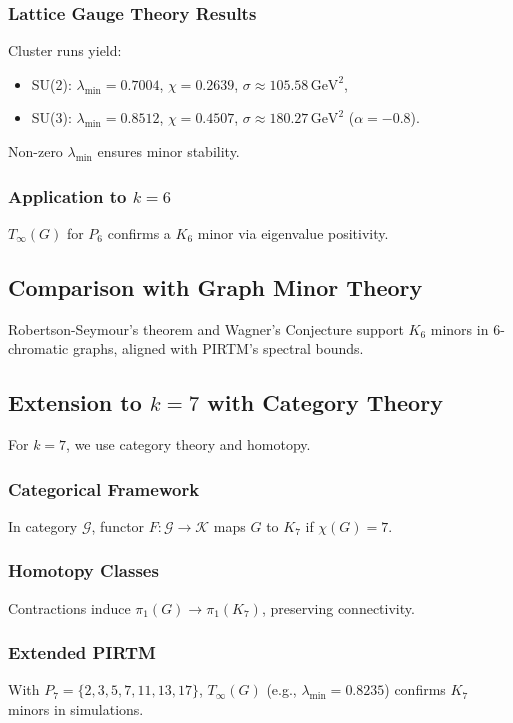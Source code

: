 \documentclass[11pt]{article}
\theoremstyle{plain}
\begin{document}
\subsubsection{Lattice Gauge Theory Results}
Cluster runs yield:
\begin{itemize}
    \item SU(2): \( \lambda_{\text{min}} = 0.7004 \), \( \chi = 0.2639 \), \( \sigma \approx 105.58 \, \text{GeV}^2 \),
    \item SU(3): \( \lambda_{\text{min}} = 0.8512 \), \( \chi = 0.4507 \), \( \sigma \approx 180.27 \, \text{GeV}^2 \) (\(\alpha = -0.8\)).
\end{itemize}
Non-zero \( \lambda_{\text{min}} \) ensures minor stability.

\subsubsection{Application to \( k = 6 \)}
\( T_\infty(G) \) for \( P_6 \) confirms a \( K_6 \) minor via eigenvalue positivity.

\subsection{Comparison with Graph Minor Theory}
Robertson-Seymour’s theorem and Wagner’s Conjecture support \( K_6 \) minors in 6-chromatic graphs, aligned with PIRTM’s spectral bounds.

\subsection{Extension to \( k = 7 \) with Category Theory}
For \( k = 7 \), we use category theory and homotopy.

\subsubsection{Categorical Framework}
In category \( \mathcal{G} \), functor \( F: \mathcal{G} \to \mathcal{K} \) maps \( G \) to \( K_7 \) if \( \chi(G) = 7 \).

\subsubsection{Homotopy Classes}
Contractions induce \( \pi_1(G) \to \pi_1(K_7) \), preserving connectivity.

\subsubsection{Extended PIRTM}
With \( P_7 = \{2, 3, 5, 7, 11, 13, 17\} \), \( T_\infty(G) \) (e.g., \( \lambda_{\text{min}} = 0.8235 \)) confirms \( K_7 \) minors in simulations.
\end{document}
